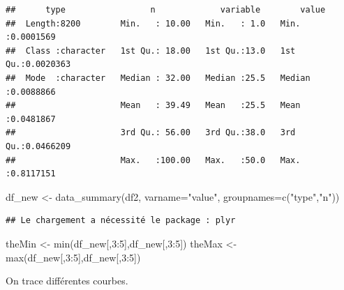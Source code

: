 \documentclass[
]{article}
\newenvironment{Shaded}{\begin{snugshade}}{\end{snugshade}}
\newcommand{\AttributeTok}[1]{\textcolor[rgb]{0.77,0.63,0.00}{#1}}
\newcommand{\DecValTok}[1]{\textcolor[rgb]{0.00,0.00,0.81}{#1}}
\newcommand{\FunctionTok}[1]{\textcolor[rgb]{0.00,0.00,0.00}{#1}}
\newcommand{\NormalTok}[1]{#1}
\newcommand{\OtherTok}[1]{\textcolor[rgb]{0.56,0.35,0.01}{#1}}
\newcommand{\SpecialCharTok}[1]{\textcolor[rgb]{0.00,0.00,0.00}{#1}}
\newcommand{\StringTok}[1]{\textcolor[rgb]{0.31,0.60,0.02}{#1}}
\begin{document}
\begin{verbatim}
##      type                 n             variable        value          
##  Length:8200        Min.   : 10.00   Min.   : 1.0   Min.   :0.0001569  
##  Class :character   1st Qu.: 18.00   1st Qu.:13.0   1st Qu.:0.0020363  
##  Mode  :character   Median : 32.00   Median :25.5   Median :0.0088866  
##                     Mean   : 39.49   Mean   :25.5   Mean   :0.0481867  
##                     3rd Qu.: 56.00   3rd Qu.:38.0   3rd Qu.:0.0466209  
##                     Max.   :100.00   Max.   :50.0   Max.   :0.8117151
\end{verbatim}

\begin{Shaded}
\begin{Highlighting}[]
\NormalTok{df\_new }\OtherTok{\textless{}{-}} \FunctionTok{data\_summary}\NormalTok{(df2, }\AttributeTok{varname=}\StringTok{"value"}\NormalTok{,}
                           \AttributeTok{groupnames=}\FunctionTok{c}\NormalTok{(}\StringTok{"type"}\NormalTok{,}\StringTok{"n"}\NormalTok{))}
\end{Highlighting}
\end{Shaded}

\begin{verbatim}
## Le chargement a nécessité le package : plyr
\end{verbatim}

\begin{Shaded}
\begin{Highlighting}[]
\NormalTok{theMin }\OtherTok{\textless{}{-}} \FunctionTok{min}\NormalTok{(df\_new[,}\DecValTok{3}\SpecialCharTok{:}\DecValTok{5}\NormalTok{],df\_new[,}\DecValTok{3}\SpecialCharTok{:}\DecValTok{5}\NormalTok{])}
\NormalTok{theMax }\OtherTok{\textless{}{-}} \FunctionTok{max}\NormalTok{(df\_new[,}\DecValTok{3}\SpecialCharTok{:}\DecValTok{5}\NormalTok{],df\_new[,}\DecValTok{3}\SpecialCharTok{:}\DecValTok{5}\NormalTok{])}
\end{Highlighting}
\end{Shaded}

On trace différentes courbes.
\end{document}
